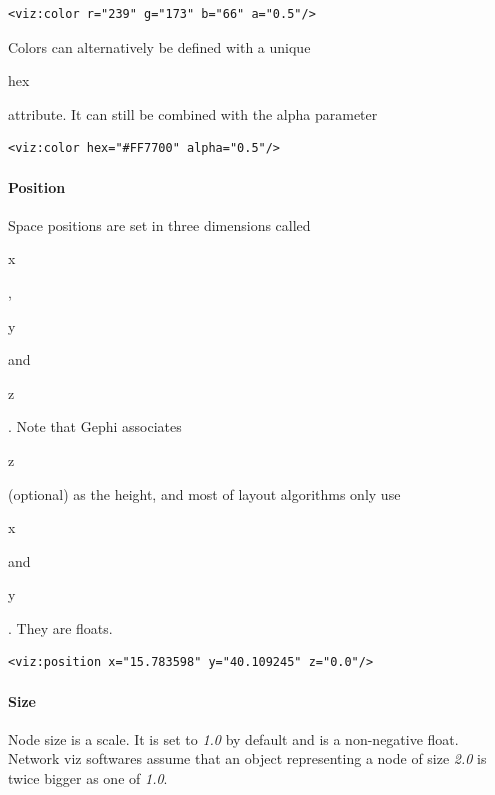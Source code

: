 \documentclass[a4paper,10pt]{article}
\begin{document}
\lstset{ style=gexf }
\begin{lstlisting}[caption={VIZ Color Declaration},label=vizcolor]
<viz:color r="239" g="173" b="66" a="0.5"/>
\end{lstlisting}

Colors can alternatively be defined with a unique \begin{footnotesize}hex\end{footnotesize} attribute. It can still be combined with the alpha parameter

\lstset{ style=gexf }
\begin{lstlisting}[caption={Color Hex Attribute},label=vizhex]
<viz:color hex="#FF7700" alpha="0.5"/>
\end{lstlisting}

\paragraph{Position}

Space positions are set in three dimensions called \begin{footnotesize}x\end{footnotesize}, \begin{footnotesize}y\end{footnotesize} and \begin{footnotesize}z\end{footnotesize}. Note that Gephi associates \begin{footnotesize}z\end{footnotesize} (optional) as the height, and most of layout algorithms only use \begin{footnotesize}x\end{footnotesize} and \begin{footnotesize}y\end{footnotesize}. They are floats.

\lstset{ style=gexf }
\begin{lstlisting}[caption={VIZ Position Declaration},label=vizposition]
<viz:position x="15.783598" y="40.109245" z="0.0"/>
\end{lstlisting}

\paragraph{Size}

Node size is a scale. It is set to \textit{1.0} by default and is a non-negative float. Network viz softwares assume that an object representing a node of size \textit{2.0} is twice bigger as one of \textit{1.0}.
\end{document}
